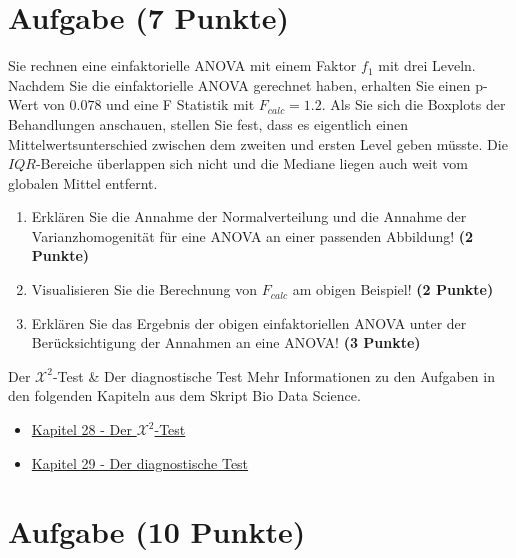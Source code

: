 \documentclass[a4paper, 10pt]{scrartcl}\usepackage[]{graphicx}\usepackage[]{xcolor}
\begin{document}
 
\clearpage

\section{Aufgabe \hfill (7 Punkte)}



Sie rechnen eine einfaktorielle ANOVA mit einem Faktor $f_1$ mit
drei Leveln. Nachdem Sie die einfaktorielle ANOVA gerechnet
haben, erhalten Sie einen p-Wert von $0.078$ und eine F Statistik mit
$F_{calc} = 1.2$. Als Sie sich die Boxplots der Behandlungen anschauen,
stellen Sie fest, dass es eigentlich einen Mittelwertsunterschied zwischen
dem zweiten und ersten Level geben m{\"u}sste. Die
$IQR$-Bereiche {\"u}berlappen sich nicht und die Mediane liegen auch weit vom
globalen Mittel entfernt.


\begin{enumerate}
\item Erkl{\"a}ren Sie die Annahme der Normalverteilung und die Annahme der
  Varianzhomogenit{\"a}t f{\"u}r eine ANOVA an einer passenden Abbildung! \textbf{(2 Punkte)}
\item Visualisieren Sie die Berechnung von $F_{calc}$ am obigen Beispiel!
  \textbf{(2 Punkte)}
\item Erkl{\"a}ren Sie das Ergebnis der obigen einfaktoriellen ANOVA unter der
  Ber{\"u}cksichtigung der Annahmen an eine ANOVA! \textbf{(3 Punkte)}
\end{enumerate}

 
\clearpage
  \begin{graybox}{Der $\mathcal{X}^2$-Test \& Der diagnostische Test}
Mehr Informationen zu den Aufgaben in den folgenden Kapiteln aus dem Skript Bio Data Science.
  \begin{itemize}
  \item \href{https://jkruppa.github.io/stat-tests-chi-test.html}{Kapitel 28 - Der $\mathcal{X}^2$-Test}
  \item \href{https://jkruppa.github.io/stat-tests-diagnostic.html}{Kapitel 29 - Der diagnostische Test}
  \end{itemize}
\end{graybox}

\section{Aufgabe \hfill (10 Punkte)}
\end{document}
